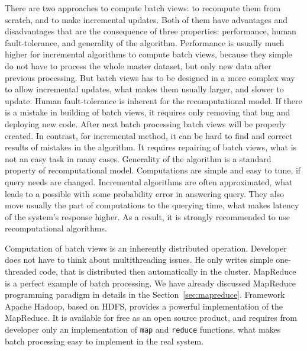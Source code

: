 There are two approaches to compute batch views: to recompute them from scratch, and to make incremental updates.
Both of them have advantages and disadvantages that are the consequence of three properties: performance, human fault-tolerance, and generality of the algorithm.
Performance is usually much higher for incremental algorithms to compute batch views, because they simple do not have to process the whole master dataset, but only new data after previous processing.
But batch views has to be designed in a more complex way to allow incremental updates, what makes them usually larger, and slower to update.
Human fault-tolerance is inherent for the recomputational model.
If there is a mistake in building of batch views, it requires only removing that bug and deploying new code.
After next batch processing batch views will be properly created.
In contrast, for incremental method, it can be hard to find and correct results of mistakes in the algorithm.
It requires repairing of batch views, what is not an easy task in many cases.
Generality of the algorithm is a standard property of recomputational model.
Computations are simple and easy to tune, if query needs are changed.
Incremental algorithms are often approximated, what leads to a possible with some probability error in answering query.
They also move usually the part of computations to the querying time, what makes latency of the system's response higher.
As a result, it is strongly recommended to use recomputational algorithms.

Computation of batch views is an inherently distributed operation.
Developer does not have to think about multithreading issues.
He only writes simple one-threaded code, that is distributed then automatically in the cluster.
MapReduce is a perfect example of batch processing.
We have already discussed MapReduce programming paradigm in details in the Section~\ref{sec:mapreduce}.
Framework Apache Hadoop, based on HDFS, provides a powerful implementation of the MapReduce.
It is available for free as an open source product, and requires from developer only an implementation of \lstinline{map} and \lstinline{reduce} functions, what makes batch processing easy to implement in the real system.